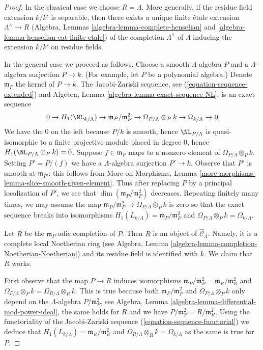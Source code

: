 \begin{proof}
In the classical case we choose $R = \Lambda$. More generally, if
the residue field extension $k/k'$ is separable, then there exists
a unique finite \'etale extension $\Lambda^\wedge \to R$
(Algebra, Lemmas \ref{algebra-lemma-complete-henselian} and
\ref{algebra-lemma-henselian-cat-finite-etale})
of the completion $\Lambda^\wedge$ of $\Lambda$
inducing the extension $k/k'$ on residue fields.

\medskip\noindent
In the general case we proceed as follows. Choose a smooth
$\Lambda$-algebra $P$ and a $\Lambda$-algebra surjection $P \to k$.
(For example, let $P$ be a polynomial algebra.)
Denote $\mathfrak m_P$ the kernel of $P \to k$. The Jacobi-Zariski sequence,
see (\ref{equation-sequence-extended}) and 
Algebra, Lemma \ref{algebra-lemma-exact-sequence-NL}, is an
exact sequence
$$
0 \to H_1(\NL_{k/\Lambda}) \to
\mathfrak m_P/\mathfrak m_P^2 \to
\Omega_{P/\Lambda} \otimes_P k \to
\Omega_{k/\Lambda} \to 0
$$
We have the $0$ on the left because $P/k$ is smooth, hence
$\NL_{P/\Lambda}$ is quasi-isomorphic to a finite projective module
placed in degree $0$, hence $H_1(\NL_{P/\Lambda} \otimes_P k) = 0$.
Suppose $f \in \mathfrak m_P$ maps to a nonzero element
of $\Omega_{P/\Lambda} \otimes_P k$. Setting $P' = P/(f)$ we have a
$\Lambda$-algebra surjection $P' \to k$.
Observe that $P'$ is smooth at $\mathfrak m_{P'}$:
this follows from More on Morphisms, Lemma
\ref{more-morphisms-lemma-slice-smooth-given-element}.
Thus after replacing $P$ by a principal localization
of $P'$, we see that $\dim(\mathfrak m_P/\mathfrak m_P^2)$
decreases. Repeating finitely many times, we may assume
the map $\mathfrak m_P/\mathfrak m_P^2 \to
\Omega_{P/\Lambda} \otimes_P k$ is zero so that
the exact sequence breaks into isomorphisms
$H_1(L_{k/\Lambda}) = \mathfrak m_P/\mathfrak m_P^2$ and
$\Omega_{P/\Lambda} \otimes_P k = \Omega_{k/\Lambda}$.

\medskip\noindent
Let $R$ be the $\mathfrak m_P$-adic completion of $P$.
Then $R$ is an object of $\widehat{\mathcal{C}}_\Lambda$.
Namely, it is a complete local Noetherian ring (see
Algebra, Lemma \ref{algebra-lemma-completion-Noetherian-Noetherian})
and its residue field is identified with $k$.
We claim that $R$ works.

\medskip\noindent
First observe that the map $P \to R$ induces isomorphisms
$\mathfrak m_P/\mathfrak m_P^2 = \mathfrak m_R/\mathfrak m_R^2$
and $\Omega_{P/\Lambda} \otimes_P k = \Omega_{R/\Lambda} \otimes_R k$.
This is true because both $\mathfrak m_P/\mathfrak m_P^2$
and $\Omega_{P/\Lambda} \otimes_P k$ only depend on the
$\Lambda$-algebra $P/\mathfrak m_P^2$, see
Algebra, Lemma \ref{algebra-lemma-differential-mod-power-ideal},
the same holds for $R$ and we have $P/\mathfrak m_P^2 = R/\mathfrak m_R^2$.
Using the functoriality of the Jacobi-Zariski sequence
(\ref{equation-sequence-functorial})
we deduce that $H_1(L_{k/\Lambda}) = \mathfrak m_R/\mathfrak m_R^2$ and
$\Omega_{R/\Lambda} \otimes_R k = \Omega_{k/\Lambda}$
as the same is true for $P$.


\end{proof}

